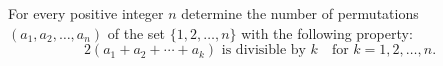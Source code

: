 For every positive integer $n$ determine the number of permutations $(a_1, a_2, \ldots, a_n)$ of the set $\{1, 2, \ldots, n\}$ with the following property:
\[
2(a_1 + a_2 + \cdots + a_k) \text{ is divisible by } k \quad \text{for } k = 1, 2, \ldots, n.
\]
